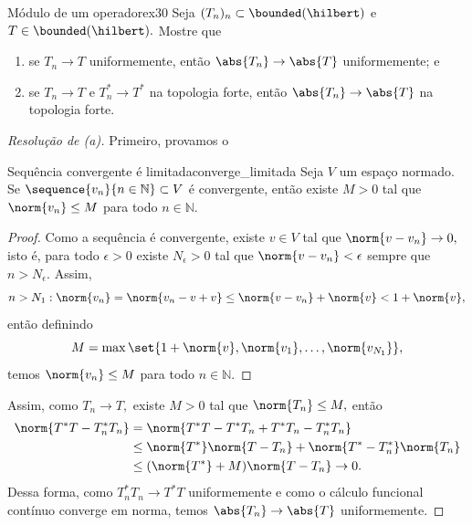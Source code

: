 \begin{exercício}{Módulo de um operador}{ex30}
    Seja \((T_n)_n \subset \bounded(\hilbert)\) e \(T \in \bounded(\hilbert).\) Mostre que
    \begin{enumerate}[label=(\alph*)]
      \item se \(T_n \to T\) uniformemente, então \(\abs{T_n} \to \abs{T}\) uniformemente; e
      \item se \(T_n \to T\) e \(T_n^* \to T^*\) na topologia forte, então \(\abs{T_n} \to \abs{T}\) na topologia forte.
    \end{enumerate}
\end{exercício}
\begin{proof}[Resolução de (a)]
  Primeiro, provamos o
  \begin{lemma}{Sequência convergente é limitada}{converge_limitada}
    Seja \(V\) um espaço normado. Se \(\sequence{v_n}{n\in\mathbb{N}}\subset V\) é convergente, então existe \(M > 0\) tal que \(\norm{v_n} \leq M\) para todo \(n \in \mathbb{N}.\)
  \end{lemma}
  \begin{proof}
    Como a sequência é convergente, existe \(v \in V\) tal que \(\norm{v - v_n} \to 0,\) isto é, para todo \(\epsilon > 0\) existe \(N_\epsilon > 0\) tal que \(\norm{v - v_n} < \epsilon\) sempre que \(n > N_\epsilon.\) Assim,
    \begin{equation*}
      n > N_1 : \norm{v_n} = \norm{v_n - v + v} \leq \norm{v - v_n} + \norm{v} < 1 + \norm{v},
    \end{equation*}
    então definindo
    \begin{equation*}
      M = \max\set{1 + \norm{v}, \norm{v_1}, \dots, \norm{v_{N_1}}},
    \end{equation*}
    temos \(\norm{v_n} \leq M\) para todo \(n \in \mathbb{N}.\)
  \end{proof}
  Assim, como \(T_n \to T,\) existe \(M > 0\) tal que \(\norm{T_n} \leq M,\) então
  \begin{align*}
    \norm{T^*T - T^*_nT_n} &= \norm{T^*T - T^*T_n + T^*T_n - T^*_nT_n}\\
                           &\leq \norm{T^*} \norm{T - T_n} + \norm{T^* - T^*_n} \norm{T_n}\\
                           &\leq (\norm{T^*} + M)\norm{T - T_n}\to 0.
  \end{align*}
  Dessa forma, como \(T_n^*T_n \to T^*T\) uniformemente e como o cálculo funcional contínuo converge em norma, temos \(\abs{T_n} \to \abs{T}\) uniformemente.
\end{proof}
